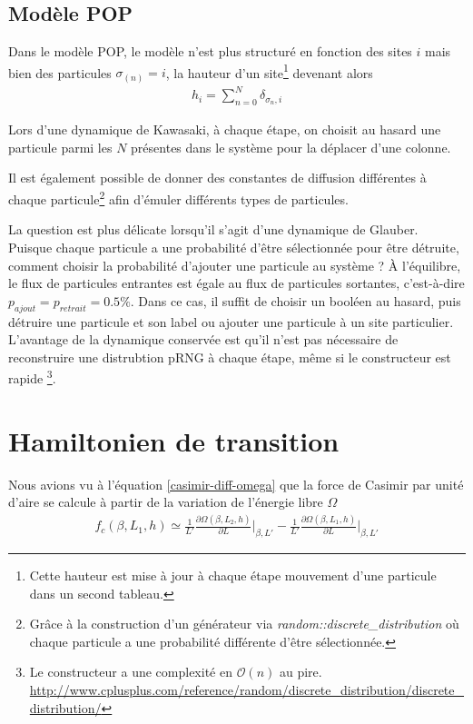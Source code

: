 	\subsection{Modèle POP}		

Dans le modèle POP, le modèle n'est plus structuré en fonction des sites $i$ mais bien des particules $\sigma_(n) = i$, la hauteur d'un site\footnote{Cette hauteur est mise à jour à chaque étape mouvement d'une particule dans un second tableau.} devenant alors
\begin{align}
	h_i = \sum_{n=0}^N \delta_{\sigma_n,i}
\end{align}

Lors d'une dynamique de Kawasaki, à chaque étape, on choisit au hasard une particule parmi les $N$ présentes dans le système pour la déplacer d'une colonne. 

Il est également possible de donner des constantes de diffusion différentes à chaque particule\footnote{Grâce à la construction d'un générateur via \textit{random::discrete\_distribution} où chaque particule a une probabilité différente d'être sélectionnée. }  afin d'émuler différents types de particules. 

La question est plus délicate lorsqu'il s'agit d'une dynamique de Glauber. Puisque chaque particule a une probabilité d'être sélectionnée pour être détruite, comment choisir la probabilité d'ajouter une particule au système ? À l'équilibre, le flux de particules entrantes est égale au flux de particules sortantes, c'est-à-dire $p_{ajout}= p_{retrait} = 0.5\%$. Dans ce cas, il suffit de choisir un booléen au hasard, puis détruire une particule et son label ou ajouter une particule à un site particulier. L'avantage de la dynamique conservée est qu'il n'est pas nécessaire de reconstruire une distrubtion pRNG à chaque étape, même si le constructeur est rapide \footnote{Le constructeur a une complexité en $\mathcal{O}(n)$ au pire. \url{http://www.cplusplus.com/reference/random/discrete_distribution/discrete_distribution/}}.

\section{Hamiltonien de transition}
\label{sec-transition}

Nous avions vu à l'équation \ref{casimir-diff-omega} que la force de Casimir par unité d'aire se calcule à partir de la variation de l'énergie libre $\Omega$
\begin{align}
    f_c(\beta,L_1,h) \simeq \frac{1}{L' }\frac{\partial \Omega(\beta,L_2,h)}{\partial L} \bigg|_{\beta,L'} -  \frac{1}{L' }\frac{\partial \Omega(\beta,L_1,h)}{\partial L} \bigg|_{\beta,L'}
\end{align}

